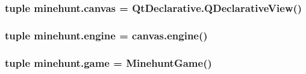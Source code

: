 \subsubsection[{canvas}]{\setlength{\rightskip}{0pt plus 5cm}tuple minehunt.\+canvas = Qt\+Declarative.\+Q\+Declarative\+View()}\label{namespaceminehunt_a95bf34e01941ada4b7ba4d7d2f2e4348}
\hypertarget{namespaceminehunt_a3b60fdaf59a43222aae1dfe8c6b1ede1}{}
\subsubsection[{engine}]{\setlength{\rightskip}{0pt plus 5cm}tuple minehunt.\+engine = canvas.\+engine()}\label{namespaceminehunt_a3b60fdaf59a43222aae1dfe8c6b1ede1}
\hypertarget{namespaceminehunt_ac090c8abc859f2cb2a63e47058fd6c78}{}
\subsubsection[{game}]{\setlength{\rightskip}{0pt plus 5cm}tuple minehunt.\+game = {\bf Minehunt\+Game}()}\label{namespaceminehunt_ac090c8abc859f2cb2a63e47058fd6c78}
